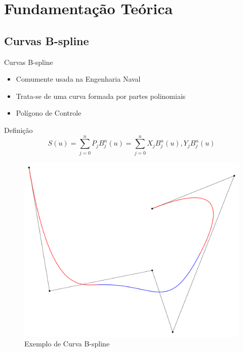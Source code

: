 \documentclass{beamer}
\begin{document}
\section{Fundamentação Teórica}
\begin{frame}
\tableofcontents[ 
    currentsubsection, 
    hideothersubsections, 
    sectionstyle=show/shaded
    ] 
\end{frame}

\subsection{Curvas B-spline}
\begin{frame}{Curvas B-spline}
\begin{itemize}
\item Comumente usada na Engenharia Naval
\item Trata-se de uma curva formada por partes polinomiais
\item Polígono de Controle 
\end{itemize}

\begin{block}{Definição}
	\begin{equation}
		S(u) = \sum_{j = 0}^{n} {P_j B_j^n(u)} = \sum_{j = 0}^{n} {X_j B_j^n(u),Y_j B_j^n(u)}
	\end{equation}
\end{block}
\pause
\begin{figure}[h]
	\centering
	\includegraphics[scale=0.2]{bspline}
	\caption{Exemplo de Curva B-spline}
	\label{fig:bspline}
\end{figure}
\end{frame}
\end{document}
